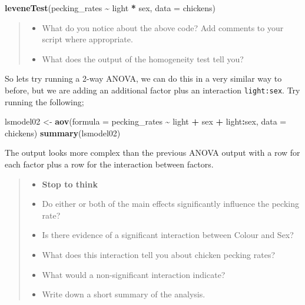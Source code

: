 \documentclass[
]{book}
\newenvironment{Shaded}{\begin{snugshade}}{\end{snugshade}}
\newcommand{\AttributeTok}[1]{\textcolor[rgb]{0.13,0.29,0.53}{#1}}
\newcommand{\FunctionTok}[1]{\textcolor[rgb]{0.13,0.29,0.53}{\textbf{#1}}}
\newcommand{\NormalTok}[1]{#1}
\newcommand{\OtherTok}[1]{\textcolor[rgb]{0.56,0.35,0.01}{#1}}
\newcommand{\SpecialCharTok}[1]{\textcolor[rgb]{0.81,0.36,0.00}{\textbf{#1}}}
\providecommand{\tightlist}{%
  \setlength{\itemsep}{0pt}\setlength{\parskip}{0pt}}
\begin{document}
\begin{Shaded}
\begin{Highlighting}[]
\FunctionTok{leveneTest}\NormalTok{(pecking\_rates }\SpecialCharTok{\textasciitilde{}}\NormalTok{ light }\SpecialCharTok{*}\NormalTok{ sex, }\AttributeTok{data =}\NormalTok{ chickens)}
\end{Highlighting}
\end{Shaded}

\begin{quote}
\begin{itemize}
\tightlist
\item
  What do you notice about the above code? Add comments to your script where appropriate.
\item
  What does the output of the homogeneity test tell you?
\end{itemize}
\end{quote}

So lets try running a 2-way ANOVA, we can do this in a very similar way to before, but we are adding an additional factor plus an interaction \texttt{light:sex}. Try running the following;

\begin{Shaded}
\begin{Highlighting}[]
\NormalTok{lsmodel02 }\OtherTok{\textless{}{-}} \FunctionTok{aov}\NormalTok{(}\AttributeTok{formula =}\NormalTok{ pecking\_rates }\SpecialCharTok{\textasciitilde{}}\NormalTok{ light }\SpecialCharTok{+}\NormalTok{ sex }\SpecialCharTok{+}\NormalTok{ light}\SpecialCharTok{:}\NormalTok{sex, }\AttributeTok{data =}\NormalTok{ chickens)}
\FunctionTok{summary}\NormalTok{(lsmodel02)}
\end{Highlighting}
\end{Shaded}

The output looks more complex than the previous ANOVA output with a row for each factor plus a row for the interaction between factors.

\begin{quote}
\begin{itemize}
\tightlist
\item
  \textbf{Stop to think}
\item
  Do either or both of the main effects significantly influence the pecking rate?
\item
  Is there evidence of a significant interaction between Colour and Sex?
\item
  What does this interaction tell you about chicken pecking rates?
\item
  What would a non-significant interaction indicate?
\item
  Write down a short summary of the analysis.
\end{itemize}
\end{quote}
\end{document}

